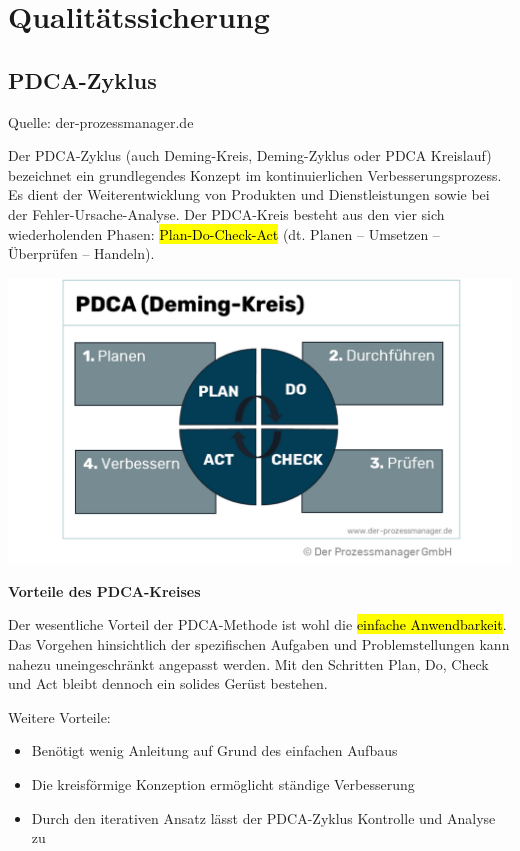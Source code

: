 \section{Qualitätssicherung}
\label{sec:Qualitätssicherung}

\subsection{PDCA-Zyklus}
\label{sec:PDCA-Zyklus}

Quelle: der-prozessmanager.de \cite{pdcaZyklus}

Der PDCA-Zyklus (auch Deming-Kreis, Deming-Zyklus oder PDCA Kreislauf) bezeichnet ein grundlegendes Konzept im kontinuierlichen Verbesserungsprozess. Es dient der Weiterentwicklung von Produkten und Dienstleistungen sowie bei der Fehler-Ursache-Analyse. Der PDCA-Kreis besteht aus den vier sich wiederholenden Phasen: \hl{Plan-Do-Check-Act} (dt. Planen – Umsetzen – Überprüfen – Handeln). 

\begin{center}
	\includegraphics[scale=0.3]{Bilder/PDCA.png}
\end{center}

\textbf{Vorteile des PDCA-Kreises}

Der wesentliche Vorteil der PDCA-Methode ist wohl die \hl{einfache Anwendbarkeit}. Das Vorgehen hinsichtlich der spezifischen Aufgaben und Problemstellungen kann nahezu uneingeschränkt angepasst werden. Mit den Schritten Plan, Do, Check und Act bleibt dennoch ein solides Gerüst bestehen.

Weitere Vorteile:

\begin{itemize}
	\item Benötigt wenig Anleitung auf Grund des einfachen Aufbaus
	\item Die kreisförmige Konzeption ermöglicht ständige Verbesserung
	\item Durch den iterativen Ansatz lässt der PDCA-Zyklus Kontrolle und Analyse zu
\end{itemize}

